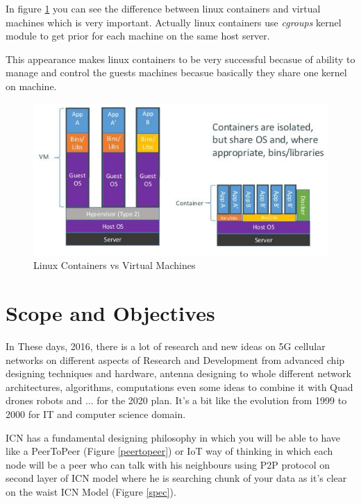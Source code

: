 In figure \ref{lxc} you can see the difference between linux containers and virtual machines which is very important. Actually linux containers use \textit{cgroups} kernel module to get prior for each machine on the same host server.

This appearance makes linux containers to be very successful becasue of ability to manage and control the guests machines becasue basically they share one kernel on machine. 

\begin{figure}[H]

\begin{center}

\includegraphics[scale = 0.35]{Pictures/lxc.png}

\caption{Linux Containers vs Virtual Machines} \label{lxc} 

\end{center}

\end{figure}


 
\section{Scope and Objectives}
In These days, 2016,  there is a lot of research and new ideas on 5G cellular networks on different aspects of Research and Development from advanced chip designing techniques and hardware, antenna designing to whole different network architectures, algorithms, computations even some ideas to combine it with Quad drones robots and ... for the 2020 plan. It's a bit like the evolution from 1999 to 2000 for IT and computer science domain.

ICN has a fundamental designing philosophy in which you will be able to have like a PeerToPeer (Figure \ref{peertopeer}) or IoT way of thinking in which each node will be a peer who can talk with his neighbours using P2P protocol on second layer of ICN model where he is searching chunk of your data as it's clear on the waist ICN Model (Figure \ref{spec}). 


